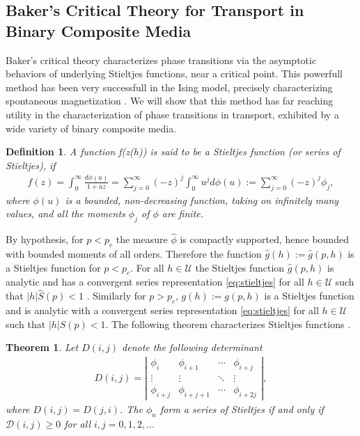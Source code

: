 \documentclass[jmp,graphicx]{revtex4-1}
\newtheorem{theorem}{Theorem}[section]
\newtheorem{definition}{Definition}[section]
\newcommand{\ph}{\hat{\phi}}
\begin{document}
\subsection{Baker's Critical Theory for Transport in Binary Composite
  Media}
%
Baker's critical theory characterizes phase transitions via the
asymptotic behaviors of underlying Stieltjes functions, near a critical 
point. This powerfull method has been very successfull in the Ising
model, precisely characterizing spontaneous magnetization
\cite{Baker-1990}. We will show that this method has far reaching
utility in the characterization of phase transitions in transport,
exhibited by a wide variety of binary composite media.   
%
\begin{definition}  \label{def:stieltjes}
  A function f(z(h)) is said to be a \emph{Stieltjes function} (or
  \emph{series of Stieltjes}), if 
  \begin{align} \label{eq:stieltjes}
    f(z)=\int_0^\infty\frac{d\phi(u)}{1+uz}
    =\sum_{j =0}^\infty(-z)^j\int_0^\infty u^jd\phi(u)
    :=\sum_{j =0}^\infty(-z)^j\phi_j,
  \end{align}
  where $\phi(u)$ is a bounded, non-decreasing function, taking on
  infinitely many values, and all the moments $\phi_j$ of $\phi$ are
  finite.  
\end{definition}
%
By hypothesis, for $p<p_c$ the measure $\ph$ is compactly supported,
hence bounded with bounded moments of all orders. Therefore the
function $\hat{g}(h):=\hat{g}(p,h)$ is a Stieltjes function for
$p<p_c$. For all $h\in\mathcal{U}$ the Stieltjes function $\hat{g}(p,h)$
is analytic and has a convergent series representation
\eqref{eq:stieltjes} for all $h\in\mathcal{U}$ such that
$|h|\hat{S}(p)<1$ \cite{Golden:PRL-3935,Golden:CMP-473}. Similarly for
$p>p_c$, $g(h):=g(p,h)$ is a Stieltjes function and is analytic
with a convergent series representation \eqref{eq:stieltjes} for all
$h\in\mathcal{U}$ such that $|h|S(p)<1$. The following theorem
characterizes Stieltjes functions \cite{Baker-1990}.  
% 
\begin{theorem} \label{thm:stieltjes_Characterization}
   Let $D(i,j)$ denote the following determinant
    \begin{align} \label{eq:Detf} 
     D(i,j) = \left|
                 \begin{matrix}
                   \phi_i&\phi_{i+1}&\cdots&\phi_{i+j}\\ 
                   \vdots&\vdots&\ddots&\vdots\\
                   \phi_{i+j}&\phi_{i+j+1}&\cdots&\phi_{i+2j}                            
                   \end{matrix}
              \right| ,    
   \end{align}
   where $D(i,j)=D(j,i)$. The $\phi_n$ form a series of Stieltjes if and
   only if $\mathcal{D}(i,j) \geq 0$ for all $i,j =0,1,2,\ldots$

 \end{theorem}
\end{document}
